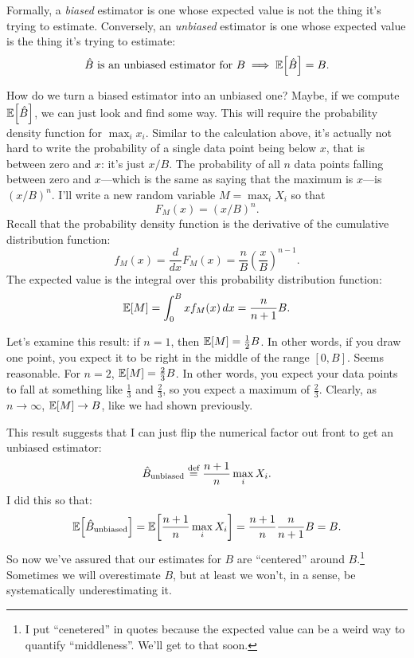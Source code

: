 Formally, a \emph{biased} estimator is one whose expected value is not the
thing it's trying to estimate. Conversely, an \emph{unbiased} estimator is
one whose expected value is the thing it's trying to estimate:
\begin{equation}
\text{$\hat{B}$ is an unbiased estimator for $B$} \implies \mathbb{E}\!\left[{\hat{B}}\right] = B.
\end{equation}

How do we turn a biased estimator into an unbiased one? Maybe, if we compute
$\mathbb{E}\!\left[{\hat{B}}\right]$, we can just look and find some way. This will require the
probability density function for $\max_i x_i$. Similar to the calculation above,
it's actually not hard to write the probability of a single data point being
below $x$, that is between zero and $x$: it's just $x/B$. The probability of all
$n$ data points falling between zero and $x$---which is the same as saying that
the maximum is $x$---is $(x/B)^n$. I'll write a new random variable $M = \max_i X_i$
so that
\begin{equation}
F_M(x) = (x/B)^n.
\end{equation}
Recall that the probability density function is the derivative of the cumulative
distribution function:
\begin{equation}
f_M(x) = \frac{d}{dx} F_M(x) = \frac{n}{B} \left( \frac{x}{B} \right)^{n-1}.
\end{equation}
The expected value is the integral over this probability distribution function:
\begin{equation}
\mathbb{E}\!\left[{M}\right] = \int_0^B x f_M(x) \,dx = \frac{n}{n+1} B.
\end{equation}

Let's examine this result: if $n=1$, then $\mathbb{E}\!\left[{M}\right] = \tfrac{1}{2}B$. In
other words, if you draw one point, you expect it to be right in the middle of
the range $[0, B]$. Seems reasonable. For $n=2$, $\mathbb{E}\!\left[{M}\right] = \tfrac{2}{3}B$.
In other words, you expect your data points to fall at something like
$\tfrac{1}{3}$ and $\tfrac{2}{3}$, so you expect a maximum of $\tfrac{2}{3}$.
Clearly, as $n \to \infty$, $\mathbb{E}\!\left[{M}\right] \to B$, like we had shown previously.

This result suggests that I can just flip the numerical factor out front to get
an unbiased estimator:
\begin{equation}
\hat{B}_\mathrm{unbiased} \stackrel{\text{def}}{=} \frac{n+1}{n} \max_i X_i.
\end{equation}
I did this so that:
\begin{equation}
\mathbb{E}\!\left[{\hat{B}_\text{unbiased}}\right] = \mathbb{E}\!\left[{\frac{n+1}{n} \max_i X_i}\right] = \frac{n+1}{n} \frac{n}{n+1} B = B.
\end{equation}
So now we've assured that our estimates for $B$ are ``centered'' around
$B$.\footnote{I put ``cenetered'' in quotes because the expected value can be
a weird way to quantify ``middleness''. We'll get to that soon.} Sometimes we
will overestimate $B$, but at least we won't, in a sense, be systematically
underestimating it.

